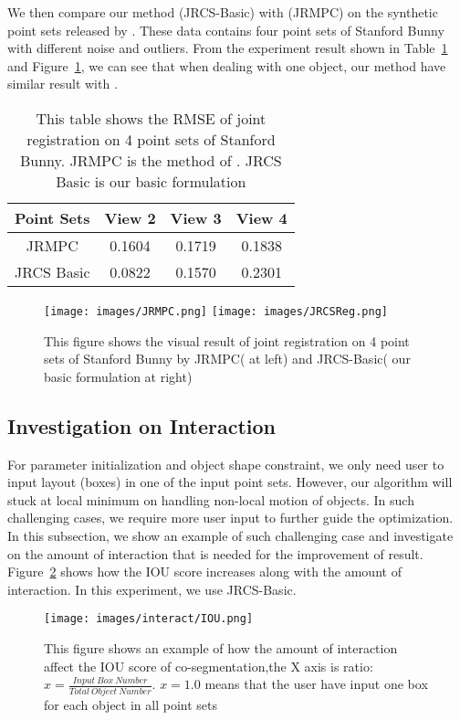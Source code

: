 We then compare our method (JRCS-Basic) with \cite{Evangelidis2014}(JRMPC) on the synthetic point sets released by \cite{Evangelidis2014}. These data contains four point sets of Stanford Bunny with different noise and outliers. From the experiment result shown in Table~\ref{tab:reg} and Figure~\ref{fig:reg}, we can see that when dealing with one object, our method have similar result with \cite{Evangelidis2014}.

\begin{table}
	\centering
	\caption{This table shows the RMSE of joint registration on 4 point sets of Stanford Bunny. JRMPC is the method of \cite{Evangelidis2014}. JRCS Basic is our basic formulation}
	\begin{tabular}{c c c c}
		Point Sets& View 2 & View 3 & View 4 \\
		\hline
		JRMPC & 0.1604 & 0.1719 & 0.1838\\   
		JRCS Basic & 0.0822 &  0.1570  & 0.2301\\
	\end{tabular}
	\label{tab:reg}
\end{table}
\begin{figure}[htb]
	\centering
	\texttt{[image: images/JRMPC.png]}
	\texttt{[image: images/JRCSReg.png]}
	\caption{This figure shows the visual result of joint registration on 4 point sets of Stanford Bunny by JRMPC(\cite{Evangelidis2014} at left) and JRCS-Basic( our basic formulation at right) }
	\label{fig:reg}
\end{figure}

\subsection{Investigation on Interaction}
\label{subsec:interact}

For parameter initialization and object shape constraint, we only need user to input layout (boxes) in one of the input point sets. However, our algorithm will stuck at local minimum on handling non-local motion of objects. In such challenging cases, we require more user input to further guide the optimization. In this subsection, we show an example of such challenging case and investigate on the amount of interaction that is needed for the improvement of result. Figure~\ref{fig:interact_number} shows how the IOU score increases along with the amount of interaction. In this experiment, we use JRCS-Basic. 
 
\begin{figure}
	\centering
	\texttt{[image: images/interact/IOU.png]}
	\caption{This figure shows an example of how the amount of interaction affect the IOU score of co-segmentation,the X axis is ratio: $x=\frac{Input~Box~Number}{Total~Object~Number}$. $x=1.0$ means that the user have input one box for each object in all point sets}
	\label{fig:interact_number}
\end{figure}


